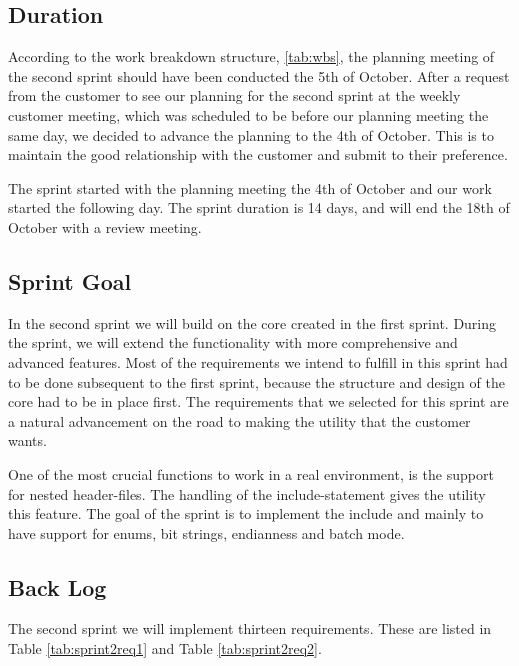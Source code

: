 \subsection{Duration}
According to the work breakdown structure, \autoref{tab:wbs}, the planning meeting of the second sprint should have been conducted the 5th of October. After a request from the customer to see our planning for the second sprint at the weekly customer meeting, which was scheduled to be before our planning meeting the same day, we decided to advance the planning to the 4th of October. This is to maintain the good relationship with the customer and submit to their preference.

The sprint started with the planning meeting the 4th of October and our work started the following day. The sprint duration is 14 days, and will end the 18th of October with a review meeting.  

\subsection{Sprint Goal}
In the second sprint we will build on the core created in the first sprint. During the sprint, we will extend the functionality with more comprehensive and advanced features. Most of the requirements we intend to fulfill in this sprint had to be done subsequent to the first sprint, because the structure and design of the core had to be in place first. The requirements that we selected for this sprint are a natural advancement on the road to making the \gls{utility} that the customer wants. 

One of the most crucial functions to work in a real environment, is the support for nested \gls{header}-files. The handling of the \gls{include}-statement gives the \gls{utility} this feature. The goal of the sprint is to implement the \gls{include} and mainly to have support for \glspl{enum}, \glspl{bit string}, \gls{endianness} and \gls{batch mode}. 

\subsection{Back Log}
\label{sec:sp2backlog}
The second sprint we will implement thirteen requirements. These are listed in Table
\ref{tab:sprint2req1} and Table \ref{tab:sprint2req2}.

